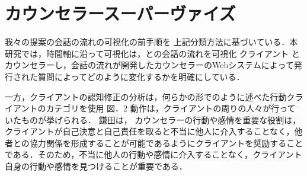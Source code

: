 \documentclass[shuuron]{kuee}
\begin{document}
\section{カウンセラースーパーヴァイズ}




我々の提案の会話の流れの可視化の前手順を 上記分類方法に基づいている．本研究では，時間軸に沿って可視化は，との会話の流れを可視化 クライアント とカウンセラーし，会話の流れが開発したカウンセラーのWebシステムによって発行された質問によってどのように変化するかを明確にしている．

一方，クライアントの認知修正の分析は，何らかの形でのように述べた行動クライアントのカテゴリを使用 図．2 動作は，クライアントの周りの人々が行っていたものが挙げられる． 鎌田\cite{kamata2002}は， カウンセラーの行動や感情を重要な役割は，クライアントが自己決意と自己責任を取ると不当に他人に介入することなく，他者との協力関係を形成することが可能であるようにクライアントを奨励することである．そのため，不当に他人の行動や感情に介入することなく，クライアント自身の行動や感情を見つけることが重要である．
\end{document}
